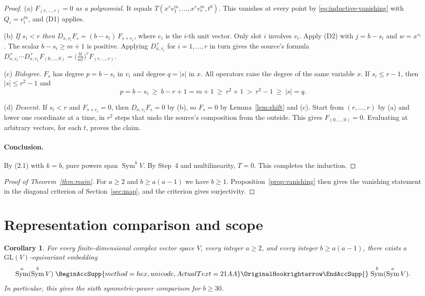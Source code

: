 \documentclass[11pt]{article}
\renewcommand{\hookrightarrow}{\mathrel{
  \BeginAccSupp{method=hex,unicode,ActualText=21AA}
  \OriginalHookrightarrow\EndAccSupp{}}}
\newtheorem{corollary}[theorem]{Corollary}
\theoremstyle{remark}
\DeclareMathOperator{\Sym}{Sym}
\newcommand{\D}[2]{D_{#1,#2}}
\begin{document}
\begin{proof}
(a) \emph{$F_{(r,\ldots,r)}=0$ as a polynomial.} It equals
$T(x^rv_1^m,\ldots,x^rv_r^m,t^b)$. This vanishes at every point by
\eqref{eq:inductive-vanishing} with $Q_i=v_i^m$, and (D1) applies.

(b) \emph{If $s_i<r$ then $\D{x}{v_i}F_s=(b-s_i)\,F_{s+e_i}$}, where
$e_i$ is the $i$-th unit vector. Only slot $i$ involves $v_i$. Apply (D2)
with $j=b-s_i$ and $w=x^{s_i}$. The scalar $b-s_i\ge m+1$ is positive.
Applying $\D{x}{v_i}^{\,r}$ for $i=1,\ldots,r$ in turn gives the source's
formula
$\D{x}{v_r}^{\,r}\cdots\D{x}{v_1}^{\,r}F_{(0,\ldots,0)}
=\bigl(\tfrac{b!}{m!}\bigr)^rF_{(r,\ldots,r)}$.

(c) \emph{Bidegree.} $F_s$ has degree $p=b-s_i$ in $v_i$ and degree
$q=|s|$ in $x$. All operators raise the degree of the same variable $x$.
If $s_i\le r-1$, then $|s|\le r^2-1$ and
\[
 p=b-s_i\ \ge\ b-r+1=m+1\ \ge\ r^2+1\ >\ r^2-1\ \ge\ |s|=q .
\]

(d) \emph{Descent.} If $s_i<r$ and $F_{s+e_i}=0$, then
$\D{x}{v_i}F_s=0$ by (b), so $F_s=0$ by Lemma~\ref{lem:shift} and (c).
Start from $(r,\ldots,r)$ by (a) and lower one coordinate at a time, in
$r^2$ steps that undo the source's composition from the outside. This
gives $F_{(0,\ldots,0)}=0$. Evaluating at arbitrary vectors, for each $t$,
proves the claim.

\paragraph{Conclusion.}
By (2.1) with $k=b$, pure powers span $\Sym^bV$. By Step~4 and
multilinearity, $T=0$. This completes the induction.
\end{proof}

\begin{proof}[Proof of Theorem~\ref{thm:main}]
For $a\ge2$ and $b\ge a(a-1)$ we have $b\ge1$.
Proposition~\ref{prop:vanishing} then gives the vanishing statement in the
diagonal criterion of Section~\ref{sec:map}, and the criterion gives
surjectivity.
\end{proof}

\section{Representation comparison and scope}\label{sec:comparison}

\begin{corollary}\label{cor:comparison}
For every finite-dimensional complex vector space $V$, every integer
$a\ge2$, and every integer $b\ge a(a-1)$, there exists a
$\mathrm{GL}(V)$-equivariant embedding
\[
 \Sym^a(\Sym^b V)\hookrightarrow\Sym^b(\Sym^a V).
\]
In particular, this gives the sixth symmetric-power comparison for $b\ge30$.
\end{corollary}
\end{document}
